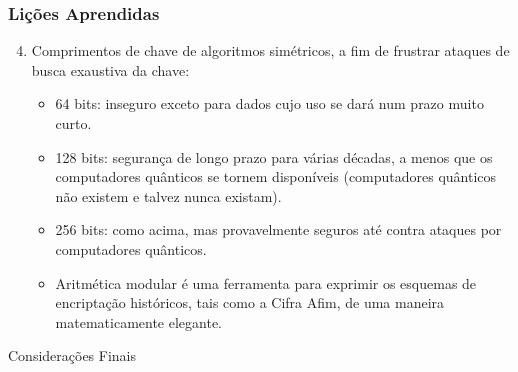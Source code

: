 \documentclass[compress]{beamer}
\begin{document}
\begin{frame}
\frametitle{Lições Aprendidas}
\justifying
	\begin{enumerate}
		\setcounter{enumi}{3}
		\item<+->{Comprimentos de chave de algoritmos simétricos, a fim de frustrar ataques de busca exaustiva da chave:}
		\begin{itemize}
			\item<+->{64 bits: inseguro exceto para dados cujo uso se dará num prazo muito curto.}
			\item<+->{128 bits: segurança de longo prazo para várias décadas, a menos que os computadores quânticos se tornem disponíveis (computadores quânticos não existem e talvez nunca existam).}
			\item<+->{256 bits: como acima, mas provavelmente seguros até contra ataques por computadores quânticos.}
			\item<+->{Aritmética modular é uma ferramenta para exprimir os esquemas de encriptação históricos, tais como a Cifra Afim, de uma maneira matematicamente elegante.}
		\end{itemize}
	\end{enumerate}
\end{frame}

\begin{frame}{Considerações Finais}
\end{frame}

\end{document}
